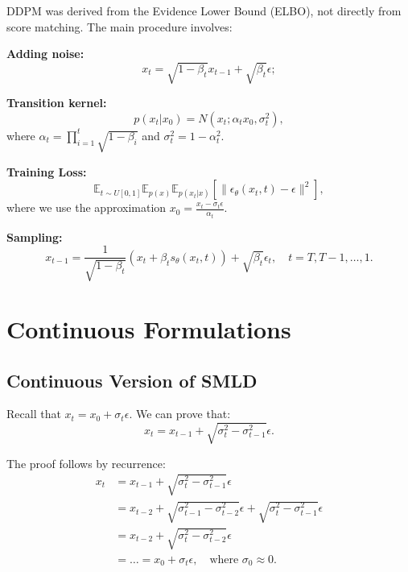 DDPM was derived from the Evidence Lower Bound (ELBO), not directly from score matching. The main procedure involves:

\textbf{Adding noise:}
\begin{equation}
x_t = \sqrt{1-\beta_t}x_{t-1} + \sqrt{\beta_t}\epsilon;
\end{equation}

\textbf{Transition kernel:}
\begin{equation}
p(x_t|x_0) = N(x_t;\alpha_t x_0, \sigma_t^2),
\end{equation}
where $\alpha_t = \prod_{i=1}^{t} \sqrt{1-\beta_i}$ and $\sigma_t^2 = 1-\alpha_t^2$.

\textbf{Training Loss:}
\begin{equation}
\mathbb{E}_{t \sim U[0,1]}\mathbb{E}_{p(x)}\mathbb{E}_{p(x_t|x)}\left[\|\epsilon_\theta(x_t,t) - \epsilon\|^2\right],
\end{equation}
where we use the approximation $x_0 = \frac{x_t-\sigma_t\epsilon}{\alpha_t}$.

\textbf{Sampling:}
\begin{equation}
x_{t-1} = \frac{1}{\sqrt{1-\beta_t}}(x_t + \beta_t s_\theta(x_t, t)) + \sqrt{\beta_t}\epsilon_t, \quad t = T, T-1, \ldots, 1.
\end{equation}

\section{Continuous Formulations}

\subsection{Continuous Version of SMLD}

Recall that $x_t = x_0 + \sigma_t\epsilon$. We can prove that:
\begin{equation}
x_t = x_{t-1} + \sqrt{\sigma_t^2-\sigma_{t-1}^2}\epsilon.
\end{equation}

The proof follows by recurrence:
\begin{align}
x_t &= x_{t-1} + \sqrt{\sigma_t^2-\sigma_{t-1}^2}\epsilon\\
&= x_{t-2} + \sqrt{\sigma_{t-1}^2-\sigma_{t-2}^2}\epsilon + \sqrt{\sigma_t^2-\sigma_{t-1}^2}\epsilon\\
&= x_{t-2} + \sqrt{\sigma_t^2-\sigma_{t-2}^2}\epsilon\\
&= \ldots = x_0 + \sigma_t\epsilon, \quad \text{where } \sigma_0 \approx 0.
\end{align}


